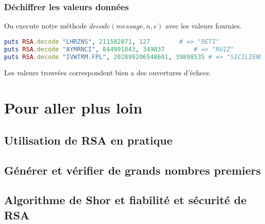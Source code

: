 \documentclass[a4paper,10pt]{article}
\begin{document}
\subsubsection{Déchiffrer les valeurs données}
On execute notre méthode $decode(message, n, c)$ avec les valeurs fournies.
\begin{lstlisting}[language=Ruby]
puts RSA.decode "LHRZNS", 211582871, 127		# => "RETI"
puts RSA.decode "AYMRNCI", 844991843, 349837		# => "RUIZ"
puts RSA.decode "IVWTRM.FPL", 202899206548601, 39898535	# => "SICILIENNE"
\end{lstlisting}
Les valeurs trouvées correspondent bien a des ouvertures d'échecs.

\clearpage
\section{Pour aller plus loin}
\subsection{Utilisation de RSA en pratique}
\subsection{Générer et vérifier de grands nombres premiers}
\subsection{Algorithme de Shor et fiabilité et sécurité de RSA}
\end{document}
